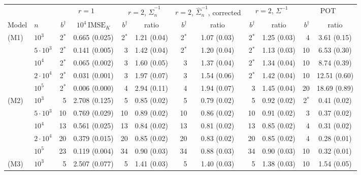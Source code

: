 \begingroup\small\setlength{\tabcolsep}{3.5pt}
\begin{tabular}{llrcrcrcrcrc}
\toprule
& & \multicolumn{2}{c}{$r=1$} & \multicolumn{2}{c}{$r=2$, $\hat\Sigma_n^{-1}$} & \multicolumn{2}{c}{$r=2$, $\hat\Sigma_n^{-1}$, corrected} & \multicolumn{2}{c}{$r=2$, $\Sigma^{-1}$} & \multicolumn{2}{c}{POT}\\
\cmidrule(lr){3-4}\cmidrule(lr){5-6}\cmidrule(lr){7-8}\cmidrule(lr){9-10}\cmidrule(lr){11-12}
Model & $n$ & $b^\dagger$ & $10^4\,\mathrm{IMSE}_K$ & $b^\dagger$ & ratio & $b^\dagger$ & ratio & $b^\dagger$ & ratio & $b^\dagger$ & ratio\\
\midrule
(M1) & $10^3$ & 2$^{\ast}$ & 0.665 (0.025) & 2$^{\ast}$ & 1.21 (0.04) & 2$^{\ast}$ & 1.07 (0.03) & 2$^{\ast}$ & 1.25 (0.03) & 4 & 3.61 (0.15)\\
 & $5\cdot10^3$ & 2$^{\ast}$ & 0.141 (0.005) & 3 & 1.42 (0.04) & 2$^{\ast}$ & 1.20 (0.04) & 2$^{\ast}$ & 1.13 (0.03) & 10 & 6.53 (0.30)\\
 & $10^4$ & 2$^{\ast}$ & 0.065 (0.002) & 3 & 1.60 (0.05) & 3 & 1.37 (0.04) & 2$^{\ast}$ & 1.34 (0.04) & 10 & 8.74 (0.39)\\
 & $2\cdot10^4$ & 2$^{\ast}$ & 0.031 (0.001) & 3 & 1.97 (0.07) & 3 & 1.54 (0.06) & 2$^{\ast}$ & 1.42 (0.04) & 10 & 12.51 (0.60)\\
 & $10^5$ & 2$^{\ast}$ & 0.006 (0.000) & 4 & 2.94 (0.11) & 4 & 1.94 (0.07) & 3 & 1.45 (0.04) & 20 & 18.69 (0.89)\\
\addlinespace[2pt]
(M2) & $10^3$ & 5 & 2.708 (0.125) & 5 & 0.85 (0.02) & 5 & 0.79 (0.02) & 5 & 0.92 (0.02) & 2$^{\ast}$ & 0.41 (0.02)\\
 & $5\cdot10^3$ & 10 & 0.769 (0.029) & 10 & 0.89 (0.02) & 10 & 0.86 (0.02) & 10 & 0.91 (0.02) & 3 & 0.37 (0.02)\\
 & $10^4$ & 13 & 0.561 (0.025) & 13 & 0.84 (0.02) & 13 & 0.81 (0.02) & 13 & 0.85 (0.02) & 4 & 0.31 (0.02)\\
 & $2\cdot10^4$ & 20 & 0.379 (0.015) & 20 & 0.85 (0.02) & 20 & 0.83 (0.02) & 20 & 0.85 (0.02) & 4 & 0.28 (0.01)\\
 & $10^5$ & 23 & 0.119 (0.004) & 34 & 0.90 (0.03) & 34 & 0.88 (0.03) & 34 & 0.90 (0.03) & 10 & 0.32 (0.01)\\
\addlinespace[2pt]
(M3) & $10^3$ & 5 & 2.507 (0.077) & 5 & 1.41 (0.03) & 5 & 1.40 (0.03) & 5 & 1.38 (0.03) & 10 & 1.54 (0.05)\\

\end{tabular}
